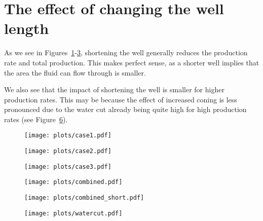 

\section{The effect of changing the well length} %
\label{sec:the_effect_of_changing_the_well_length}
As we see in Figures~\ref{fig:case1}-\ref{fig:case3}, shortening the well generally reduces the production rate and total production. This makes perfect sense, as a shorter well implies that the area the fluid can flow through is smaller.

We also see that the impact of shortening the well is smaller for higher production rates. This may be because the effect of increased coning is less pronounced due to the water cut already being quite high for high production rates (see Figure~\ref{fig:watercut}).

\begin{figure}[htbp]
  \centerline{\texttt{[image: plots/case1.pdf]}}
  \caption{}
  \label{fig:case1}
\end{figure}

\begin{figure}[htbp]
  \centerline{\texttt{[image: plots/case2.pdf]}}
  \caption{}
  \label{fig:case2}
\end{figure}

\begin{figure}[htbp]
  \centerline{\texttt{[image: plots/case3.pdf]}}
  \caption{}
  \label{fig:case3}
\end{figure}

\begin{figure}[htbp]
  \centerline{\texttt{[image: plots/combined.pdf]}}
  \caption{}
  \label{fig:combination}
\end{figure}

\begin{figure}[htbp]
  \centerline{\texttt{[image: plots/combined\_short.pdf]}}
  \caption{}
  \label{fig:combination_short}
\end{figure}

\begin{figure}[htbp]
  \centerline{\texttt{[image: plots/watercut.pdf]}}
  \caption{}
  \label{fig:watercut}
\end{figure}


